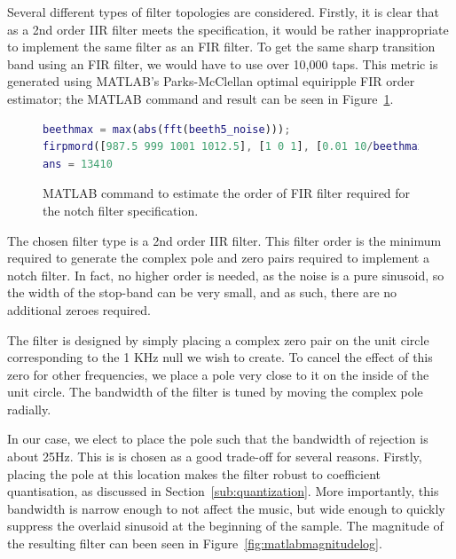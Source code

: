 \documentclass[]{article}
\begin{document}
Several different types of filter topologies are considered. Firstly, it is clear that as a 2nd order IIR filter meets the specification, it would be rather inappropriate to implement the same filter as an FIR filter. To get the same sharp transition band using an FIR filter, we would have to use over 10,000 taps. This metric is generated using MATLAB's Parks-McClellan optimal equiripple FIR order estimator; the MATLAB command and result can be seen in Figure~\ref{fig:firpmord}.

\begin{figure}[tbp]
	\begin{center}
		\begin{lstlisting}[language = Matlab]
beethmax = max(abs(fft(beeth5_noise)));
firpmord([987.5 999 1001 1012.5], [1 0 1], [0.01 10/beethmax 0.01], 44100)
ans = 13410
		\end{lstlisting}
	\end{center}
	\caption{MATLAB command to estimate the order of FIR filter required for the notch filter specification.}
	\label{fig:firpmord}
\end{figure}

The chosen filter type is a 2nd order IIR filter. This filter order is the minimum required to generate the complex pole and zero pairs required to implement a notch filter. In fact, no higher order is needed, as the noise is a pure sinusoid, so the width of the stop-band can be very small, and as such, there are no additional zeroes required.

The filter is designed by simply placing a complex zero pair on the unit circle corresponding to the 1 KHz null we wish to create. To cancel the effect of this zero for other frequencies, we place a pole very close to it on the inside of the unit circle. The bandwidth of the filter is tuned by moving the complex pole radially.

In our case, we elect to place the pole such that the bandwidth of rejection is about 25Hz. This is is chosen as a good trade-off for several reasons. Firstly, placing the pole at this location makes the filter robust to coefficient quantisation, as discussed in Section~\ref{sub:quantization}.
More importantly, this bandwidth is narrow enough to not affect the music, but wide enough to quickly suppress the overlaid sinusoid at the beginning of the sample.
The magnitude of the resulting filter can been seen in Figure~\ref{fig:matlabmagnitudelog}.

\end{document}
